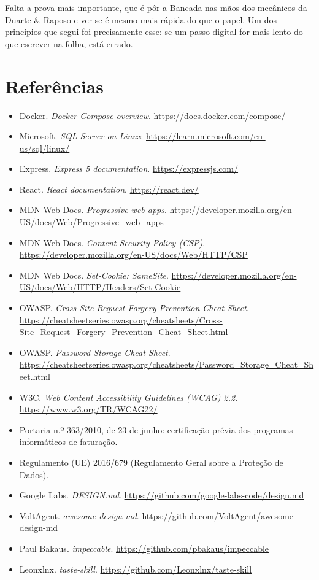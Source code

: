 \documentclass[a4paper,12pt]{article}
\begin{document}
Falta a prova mais importante, que é pôr a Bancada nas mãos dos mecânicos da Duarte \& Raposo e ver se é mesmo mais rápida do que o papel. Um dos princípios que segui foi precisamente esse: se um passo digital for mais lento do que escrever na folha, está errado.

\clearpage

\section*{Referências}

\begin{itemize}
    \item Docker. \textit{Docker Compose overview}. \url{https://docs.docker.com/compose/}
    \item Microsoft. \textit{SQL Server on Linux}. \url{https://learn.microsoft.com/en-us/sql/linux/}
    \item Express. \textit{Express 5 documentation}. \url{https://expressjs.com/}
    \item React. \textit{React documentation}. \url{https://react.dev/}
    \item MDN Web Docs. \textit{Progressive web apps}. \url{https://developer.mozilla.org/en-US/docs/Web/Progressive_web_apps}
    \item MDN Web Docs. \textit{Content Security Policy (CSP)}. \url{https://developer.mozilla.org/en-US/docs/Web/HTTP/CSP}
    \item MDN Web Docs. \textit{Set-Cookie: SameSite}. \url{https://developer.mozilla.org/en-US/docs/Web/HTTP/Headers/Set-Cookie}
    \item OWASP. \textit{Cross-Site Request Forgery Prevention Cheat Sheet}. \url{https://cheatsheetseries.owasp.org/cheatsheets/Cross-Site_Request_Forgery_Prevention_Cheat_Sheet.html}
    \item OWASP. \textit{Password Storage Cheat Sheet}. \url{https://cheatsheetseries.owasp.org/cheatsheets/Password_Storage_Cheat_Sheet.html}
    \item W3C. \textit{Web Content Accessibility Guidelines (WCAG) 2.2}. \url{https://www.w3.org/TR/WCAG22/}
    \item Portaria n.º 363/2010, de 23 de junho: certificação prévia dos programas informáticos de faturação.
    \item Regulamento (UE) 2016/679 (Regulamento Geral sobre a Proteção de Dados).
    \item Google Labs. \textit{DESIGN.md}. \url{https://github.com/google-labs-code/design.md}
    \item VoltAgent. \textit{awesome-design-md}. \url{https://github.com/VoltAgent/awesome-design-md}
    \item Paul Bakaus. \textit{impeccable}. \url{https://github.com/pbakaus/impeccable}
    \item Leonxlnx. \textit{taste-skill}. \url{https://github.com/Leonxlnx/taste-skill}
\end{itemize}
\end{document}
